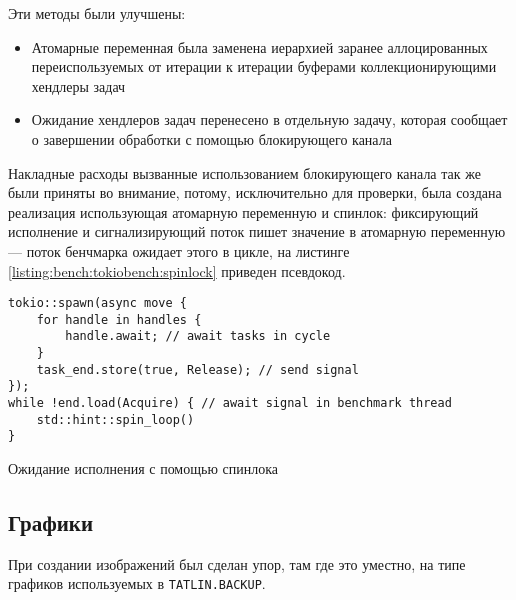 Эти методы были улучшены:

\begin{itemize}
    \item Атомарные переменная была заменена иерархией заранее аллоцированных переиспользуемых от итерации к итерации буферами коллекционирующими хендлеры задач
    \item Ожидание хендлеров задач перенесено в отдельную задачу, которая сообщает о завершении обработки с помощью блокирующего канала
\end{itemize}

Накладные расходы вызванные использованием блокирующего канала так же были приняты во внимание, потому, исключительно для проверки, была создана реализация использующая атомарную переменную и спинлок: фиксирующий исполнение и сигнализирующий поток пишет значение в атомарную переменную --- поток бенчмарка ожидает этого в цикле, на листинге \ref{listing:bench:tokiobench:spinlock} приведен псевдокод.

\begin{listing}[H]
    \begin{verbatim}
tokio::spawn(async move {
    for handle in handles {
        handle.await; // await tasks in cycle
    }
    task_end.store(true, Release); // send signal
});
while !end.load(Acquire) { // await signal in benchmark thread
    std::hint::spin_loop()
}
    \end{verbatim}
    \caption{Ожидание исполнения с помощью спинлока}
    \label{listing:bench:tokiobench:spinlock}
\end{listing}

\subsection{Графики}

При создании изображений был сделан упор, там где это уместно, на типе графиков используемых в \verb|TATLIN.BACKUP|.
